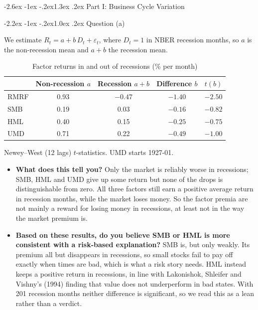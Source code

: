 \documentclass[11pt]{article}
\makeatletter
\renewcommand\section{\@startsection{section}{1}{0pt}%
  {-2.6ex \@plus -1ex \@minus -.2ex}{1.3ex \@plus .2ex}%
  {\normalfont\scshape\large\color{psink}}}   %
\renewcommand\subsection{\@startsection{subsection}{2}{0pt}%
  {-2.2ex \@plus -1ex \@minus -.2ex}{1.0ex \@plus .2ex}%
  {\normalfont\bfseries\normalsize\color{psink}}}
\newenvironment{tight}
  {\begin{itemize}\setlength{\itemsep}{3pt}\setlength{\parskip}{0pt}%
   \setlength{\topsep}{3pt}\setlength{\leftmargini}{1.4em}}
  {\end{itemize}}
\makeatother
\begin{document}
\section{Part I: Business Cycle Variation}

\subsection{Question (a)}

We estimate $R_t = a + b\,D_t + \varepsilon_t$, where $D_t = 1$ in NBER recession months,
so $a$ is the non-recession mean and $a+b$ the recession mean.

\begin{table}[H]\centering\small
\caption{Factor returns in and out of recessions (\% per month)}
\begin{tabular}{lcccc}
\toprule
 & Non-recession $a$ & Recession $a+b$ & Difference $b$ & $t(b)$ \\
\midrule
RMRF & 0.93 & $-0.47$ & $-1.40$ & $-2.50$ \\
SMB  & 0.19 & 0.03    & $-0.16$ & $-0.82$ \\
HML  & 0.40 & 0.15    & $-0.25$ & $-0.75$ \\
UMD  & 0.71 & 0.22    & $-0.49$ & $-1.00$ \\
\bottomrule
\end{tabular}
\par\smallskip\footnotesize Newey--West (12 lags) $t$-statistics. UMD starts 1927-01.
\end{table}

\begin{tight}
  \item \textbf{What does this tell you?} Only the market is reliably worse in
  recessions; SMB, HML and UMD give up some return but none of the drops is
  distinguishable from zero. All three factors still earn a positive average return in
  recession months, while the market loses money. So the factor premia are not
  mainly a reward for losing money in recessions, at least not in the way the market premium is.
  \item \textbf{Based on these results, do you believe SMB or HML is more consistent
  with a risk-based explanation?} SMB is, but only weakly. Its premium all but
  disappears in recessions, so small stocks fail to pay off exactly when times are
  bad, which is what a risk story needs. HML instead keeps a positive return in
  recessions, in line with Lakonishok, Shleifer and Vishny's (1994) finding that value does not
  underperform in bad states. With 201 recession months neither difference is
  significant, so we read this as a lean rather than a verdict.
\end{tight}
\end{document}
